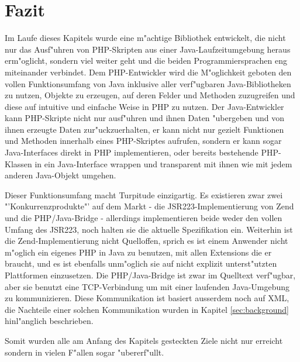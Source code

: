 \section{Fazit}
\label{sec:chap1:fazit}

Im Laufe dieses Kapitels wurde eine m"achtige Bibliothek entwickelt, die nicht nur das Ausf"uhren von
PHP-Skripten aus einer Java-Laufzeitumgebung heraus erm"oglicht, sondern viel weiter geht und die beiden
Programmiersprachen eng miteinander verbindet. Dem PHP-Entwickler wird die M"oglichkeit geboten den
vollen Funktionsumfang von Java inklusive aller verf"ugbaren Java-Bibliotheken zu nutzen, Objekte zu erzeugen,
auf deren Felder und Methoden zuzugreifen und diese auf intuitive und einfache Weise in PHP zu nutzen.
Der Java-Entwickler kann PHP-Skripte nicht nur ausf"uhren und ihnen Daten "ubergeben und von ihnen erzeugte
Daten zur"uckzuerhalten, er kann nicht nur gezielt Funktionen und Methoden innerhalb eines PHP-Skriptes
aufrufen, sondern er kann sogar Java-Interfaces direkt in PHP implementieren, oder bereits bestehende PHP-Klassen
in ein Java-Interface wrappen und transparent mit ihnen wie mit jedem anderen Java-Objekt umgehen.

Dieser Funktionsumfang macht Turpitude einzigartig. Es existieren zwar zwei "'Konkurrenzprodukte"' auf dem
Markt - die JSR223-Implementierung von Zend und die PHP/Java-Bridge \cite{BRIDGEHP} - allerdings implementieren
beide weder den vollen Umfang des JSR223, noch halten sie die aktuelle Spezifikation ein. Weiterhin ist die
Zend-Implementierung nicht Quelloffen, sprich es ist einem Anwender nicht m"oglich ein eigenes PHP in Java
zu benutzen, mit allen Extensions die er braucht, und es ist ebenfalls unm"oglich sie auf nicht explizit
unterst"utzten Plattformen einzusetzen. Die PHP/Java-Bridge ist zwar im Quelltext verf"ugbar, aber sie
benutzt eine TCP-Verbindung um mit einer laufenden Java-Umgebung zu kommunizieren. Diese Kommunikation
ist basiert ausserdem noch auf XML, die Nachteile einer solchen Kommunikation wurden in Kapitel \ref{sec:background}
hinl"anglich beschrieben. 

Somit wurden alle am Anfang des Kapitels gesteckten Ziele nicht nur erreicht sondern in vielen F"allen sogar
"ubererf"ullt.

